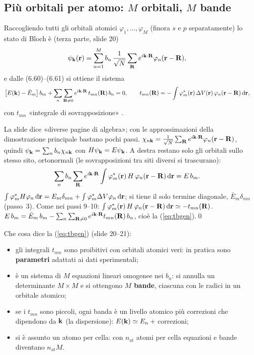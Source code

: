 \documentclass[11pt,a4paper]{article}
\begin{document}
\subsection{Più orbitali per atomo: $M$ orbitali, $M$ bande}\label{sec:tbgen}
Raccogliendo tutti gli orbitali atomici $\varphi_1,\dots,\varphi_M$ (finora $s$ e $p$ separatamente) lo stato di Bloch è (terza parte, slide 20)
\[
\psi_{\mathbf k}(\mathbf r)=\sum_{n=1}^{M}b_n\,\frac1{\sqrt N}\sum_{\mathbf R}e^{i\mathbf k\cdot\mathbf R}\varphi_n(\mathbf r-\mathbf R),
\]
e dalle (6.60)--(6.61) si ottiene il sistema
\begin{equation}\label{eq:tbgen}
\bigl[E(\mathbf k)-\bar E_m\bigr]\,b_m+\sum_{n}\sum_{\mathbf R\ne0}e^{i\mathbf k\cdot\mathbf R}\,t_{mn}(\mathbf R)\,b_n=0,\qquad
t_{mn}(\mathbf R)=-\int\varphi_m^*(\mathbf r)\,\Delta V(\mathbf r)\,\varphi_n(\mathbf r-\mathbf R)\,\mathrm d\mathbf r,
\end{equation}
con $t_{mn}$ «integrale di sovrapposizione» .
\begin{approfondimento}
La slide dice «diverse pagine di algebra»; con le approssimazioni della dimostrazione principale bastano pochi passi.
$\chi_{n\mathbf k}=\frac1{\sqrt N}\sum_{\mathbf R}e^{i\mathbf k\cdot\mathbf R}\varphi_n(\mathbf r-\mathbf R)$, quindi $\psi_{\mathbf k}=\sum_nb_n\chi_{n\mathbf k}$ con $H\psi_{\mathbf k}=E\psi_{\mathbf k}$.
A destra restano solo gli orbitali sullo stesso sito, ortonormali (le sovrapposizioni tra siti diversi si trascurano):
\[
\sum_nb_n\sum_{\mathbf R}e^{i\mathbf k\cdot\mathbf R}\int\varphi_m^*(\mathbf r)\,H\,\varphi_n(\mathbf r-\mathbf R)\,\mathrm d\mathbf r=E\,b_m .
\]
$\int\varphi_m^*H\varphi_n\,\mathrm d\mathbf r=E_m\delta_{mn}+\int\varphi_m^*\Delta V\varphi_n\,\mathrm d\mathbf r$; si tiene il solo termine diagonale, $\bar E_m\delta_{mn}$ (passo~3).
Come nei passi 9--10: $\int\varphi_m^*(\mathbf r)\,H\,\varphi_n(\mathbf r-\mathbf R)\,\mathrm d\mathbf r\simeq-t_{mn}(\mathbf R)$.
$E\,b_m=\bar E_m\,b_m-\sum_n\sum_{\mathbf R\ne0}e^{i\mathbf k\cdot\mathbf R}t_{mn}(\mathbf R)\,b_n$, cioè la (\ref{eq:tbgen}).\qed
\end{approfondimento}
Che cosa dice la (\ref{eq:tbgen}) (slide 20--21):
\begin{itemize}[leftmargin=*]
\item gli integrali $t_{mn}$ sono proibitivi con orbitali atomici veri: in pratica sono \textbf{parametri} adattati ai dati sperimentali;
\item è un sistema di $M$ equazioni lineari omogenee nei $b_n$: si annulla un determinante $M\times M$ e si ottengono \textbf{$M$ bande}, ciascuna con
le radici in un orbitale atomico;
\item se i $t_{mn}$ sono piccoli, ogni banda è un livello atomico più correzioni che dipendono da $\mathbf k$ (la dispersione): $E(\mathbf k)\simeq E_n+{}$correzioni;
\item si è assunto un atomo per cella: con $n_{\mathrm{at}}$ atomi per cella equazioni e bande diventano $n_{\mathrm{at}}M$.
\end{itemize}
\end{document}
